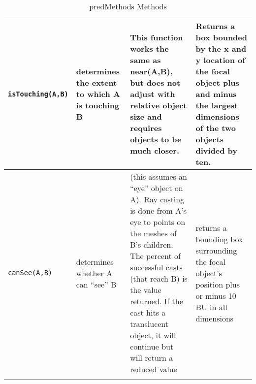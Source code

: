 \begin{longtable}{| p{3cm} | p{2.5cm} | p{5cm} | p{4cm} |}
	\texttt{isTouching(A,B)} & determines the extent to which A is touching B & This function works the same as near(A,B), but does not adjust with relative object size and requires objects to be much closer. & Returns a box bounded by the x and y location of the focal object plus and minus the largest dimensions of the two objects divided by ten. \\\hline
	
	\texttt{canSee(A,B)} & determines whether A can “see” B & (this assumes an ``eye'' object on A). Ray casting is done from A's eye to points on the meshes of B's children. The percent of successful casts (that reach B) is the value returned. If the cast hits a translucent object, it will continue but will return a reduced value
	 & returns a bounding box surrounding the focal object's position plus or minus 10 BU in all dimensions \\\hline
	
	\caption{predMethods Methods}\tabularnewline
\end{longtable}